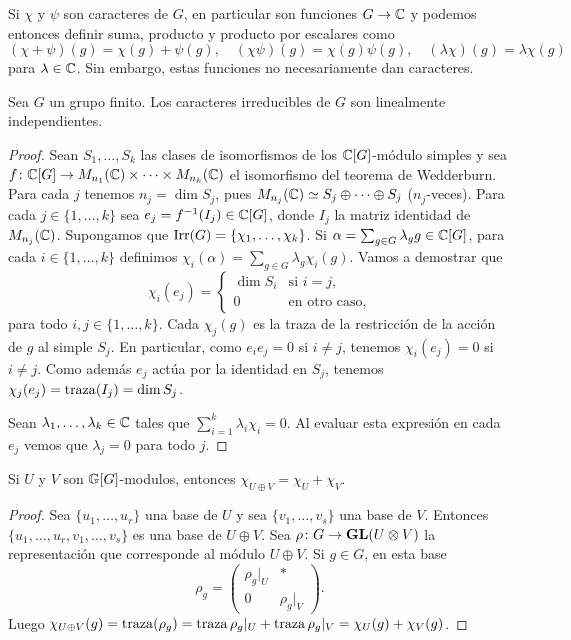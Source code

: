 Si $\chi$ y $\psi$ son caracteres de $G$, en particular son funciones $G\to\mathbb{C}$ y podemos entonces
definir suma, producto y producto por escalares como
\[
(\chi+\psi)(g)=\chi(g)+\psi(g),\quad
(\chi\psi)(g)=\chi(g)\psi(g),\quad
(\lambda\chi)(g)=\lambda\chi(g)
\]
para $\lambda\in\mathbb{C}$. Sin embargo, estas funciones no necesariamente dan caracteres. 

\begin{theorem}
Sea $G$ un grupo finito. Los caracteres irreducibles de $G$ son linealmente independientes.
\end{theorem}

\begin{proof}
Sean $S_1,\dots,S_k$ las clases de isomorfismos de los $\mathbb{C}[G]$-módulo simples y
sea $f\colon \mathbb{C}[G]\to M_{n_1}(\mathbb{C})\times\cdots\times M_{n_k}(\mathbb{C})$ el isomorfismo del teorema de Wedderburn. 
Para cada $j$ tenemos $n_j=\dim S_j$, pues $M_{n_j}(\mathbb{C})\simeq S_j\oplus\cdots\oplus S_j$ ($n_j$-veces). 
Para cada $j\in\{1,\dots,k\}$ sea 
$e_j=f^{-1}(I_j)\in\mathbb{C}[G]$, donde $I_j$ la matriz identidad de $M_{n_j}(\mathbb{C})$. 
Supongamos que $\operatorname{Irr}(G)=\{\chi_1,\dots,\chi_k\}$. 
Si $\alpha=\sum_{g\in G}\lambda_gg\in\mathbb{C}[G]$, 
para cada $i\in\{1,\dots,k\}$ 
definimos $\chi_i(\alpha)=\sum_{g\in G}\lambda_g\chi_i(g)$. 
Vamos a demostrar que
\[
\chi_i(e_j)=\begin{cases}
\dim S_i & \text{si $i=j$},\\
0 & \text{en otro caso,}
\end{cases}
\]
para todo $i,j\in\{1,\dots,k\}$.
Cada $\chi_j(g)$ es la traza de la restricción de la acción de $g$ al simple $S_j$. En particular, 
como $e_ie_j=0$ si $i\ne j$, tenemos 
$\chi_i(e_j)=0$ si $i\ne j$. 
Como además $e_j$ actúa por la identidad en $S_j$, tenemos $\chi_j(e_j)=\operatorname{traza}(I_j)=\dim S_j$. 

Sean $\lambda_1,\dots,\lambda_k\in\mathbb{C}$ tales que $\sum_{i=1}^k\lambda_i\chi_i=0$. Al evaluar esta
expresión en cada $e_j$ vemos que $\lambda_j=0$ para todo $j$. 
\end{proof}

\begin{proposition}
    Si $U$ y $V$ son $\mathbb{G}[G]$-modulos, entonces $\chi_{U\oplus V}=\chi_U+\chi_V$.
\end{proposition}

\begin{proof}
    Sea $\{u_1,\dots,u_r\}$ una base de $U$ y sea $\{v_1,\dots,v_s\}$ una base de $V$. Entonces 
    $\{u_1,\dots,u_r,v_1,\dots,v_s\}$ es una base de $U\oplus V$. 
    Sea $\rho\colon G\to \mathbf{GL}(U\otimes V)$ la representación que corresponde al módulo $U\oplus V$. 
    Si $g\in G$, en esta
    base 
    \[
    \rho_g=\begin{pmatrix}
      \rho_g|_U & *\\
      0 & \rho_g|_V
    \end{pmatrix}.
    \]
    Luego $\chi_{U\oplus V}(g)=\operatorname{traza}(\rho_g)=\operatorname{traza}\rho_g|_U+\operatorname{traza}\rho_g|_V=\chi_U(g)+\chi_V(g)$.
\end{proof}

